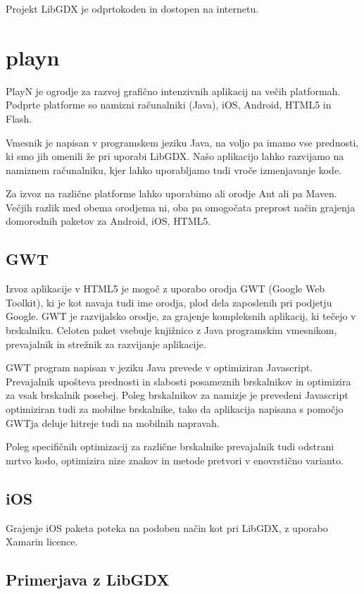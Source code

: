 Projekt LibGDX je odprtokoden in dostopen na internetu.

\section{playn}
\label{sec:playn}
PlayN\cite{playn} je ogrodje za razvoj grafično intenzivnih aplikacij na večih platformah. Podprte platforme so namizni računalniki (Java), iOS, Android, HTML5 in Flash.

Vmesnik je napisan v programskem jeziku Java, na voljo pa imamo vse prednosti, ki smo jih omenili že pri uporabi LibGDX. Našo aplikacijo lahko razvijamo na namiznem računalniku, kjer lahko uporabljamo tudi vroče izmenjavanje kode. 

Za izvoz na različne platforme lahko uporabimo ali orodje Ant ali pa Maven. Večjih razlik med obema orodjema ni, oba pa omogočata preprost način grajenja domorodnih paketov za Android, iOS, HTML5.

\subsection{GWT}

Izvoz aplikacije v HTML5 je mogoč z uporabo orodja GWT (Google Web Toolkit), ki je kot navaja tudi ime orodja, plod dela zaposlenih pri podjetju Google. GWT je razvijalsko orodje, za grajenje kompleksnih aplikacij, ki tečejo v brskalniku. Celoten paket vsebuje knjižnico z Java programskim vmesnikom, prevajalnik in strežnik za razvijanje aplikacije.

GWT program napisan v jeziku Java prevede v optimiziran Javascript. Prevajalnik upošteva prednosti in slabosti posameznih brskalnikov in optimizira za vsak brskalnik posebej. Poleg brskalnikov za namizje je prevedeni Javascript optimiziran tudi za mobilne brskalnike, tako da aplikacija napisana s pomočjo GWTja deluje hitreje tudi na mobilnih napravah.

Poleg specifičnih optimizacij za različne brskalnike prevajalnik tudi odstrani mrtvo kodo, optimizira nize znakov in metode pretvori v enovrstično varianto.

\subsection{iOS}

Grajenje iOS paketa poteka na podoben način kot pri LibGDX, z uporabo Xamarin licence.

\subsection{Primerjava z LibGDX}


